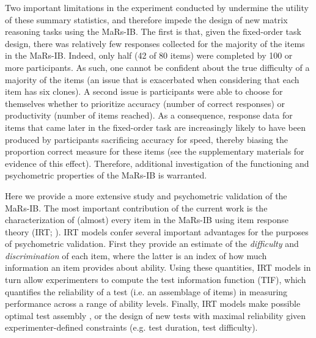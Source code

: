 \documentclass[a4paper,man,natbib]{apa6}
\begin{document}
Two important limitations in the experiment conducted by \cite{chierchia2019matrix} undermine the utility of these summary statistics, and therefore impede the design of new matrix reasoning tasks using the MaRs-IB. The first is that, given the fixed-order task design,  there was relatively few responses collected for the majority of the items in the MaRs-IB. Indeed, only half (42 of 80 items) were completed by 100 or more participants. As such, one cannot be confident about the true difficulty of a majority of the items (an issue that is exacerbated when considering that each item has six clones). A second issue is participants were able to choose for themselves whether to prioritize accuracy (number of correct responses) or productivity (number of items reached). As a consequence, response data for items that came later in the fixed-order task are increasingly likely to have been produced by participants sacrificing accuracy for speed, thereby biasing the proportion correct measure for these items (see the supplementary materials for evidence of this effect). Therefore, additional investigation of the functioning and psychometric properties of the MaRs-IB is warranted.

Here we provide a more extensive study and psychometric validation of the MaRs-IB. The most important contribution of the current work is the characterization of (almost) every item in the MaRs-IB using item response theory (IRT; \citealt{embretson2013item, de2013theory}). IRT models confer several important advantages for the purposes of psychometric validation. First they provide an estimate of the \textit{difficulty} and \textit{discrimination} of each item, where the latter is an index of how much information an item provides about ability. Using these quantities, IRT models in turn allow experimenters to compute the test information function (TIF), which quantifies the reliability of a test (i.e. an assemblage of items) in measuring performance across a range of ability levels. Finally, IRT models make possible optimal test assembly  \citep{van1998optimal}, or the design of new tests with maximal reliability given experimenter-defined constraints (e.g. test duration, test difficulty).
\end{document}
